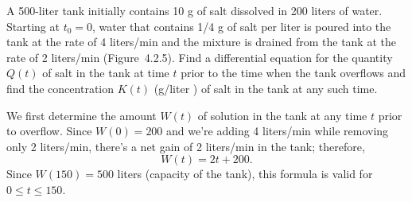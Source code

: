 \setcounter{example}{3}
\begin{example}
  \label{example:4.2.4} \rm A 500-liter tank initially contains 10 g of salt dissolved in 200 liters
  of water. Starting at $t_{0}=0$, water that contains 1/4 g of salt per liter is poured into the
  tank at the rate of 4 liters/min and the mixture is drained from the tank at the rate of 2
  liters/min (Figure~4.2.5). Find a differential equation for the quantity $Q(t)$ of
  salt in the tank at time $t$ prior to the time when the tank overflows and find the concentration
  $K(t)$ (g/liter ) of salt in the tank at any such time.
\end{example}
\setcounter{equation}{6}
\setcounter{figure}{5}
\begin{examplesolution}
\solution We first determine the amount $W(t)$ of solution in the tank at any time $t$ prior to
overflow. Since $W(0)=200$ and we're adding 4 liters/min while removing only 2 liters/min, there's a
net gain of 2 liters/min in the tank; therefore,
\[
  W(t)=2t+200.
\]
Since $W(150)=500$ liters (capacity of the tank), this formula is valid for $0\le t\le150$.


\end{examplesolution}
